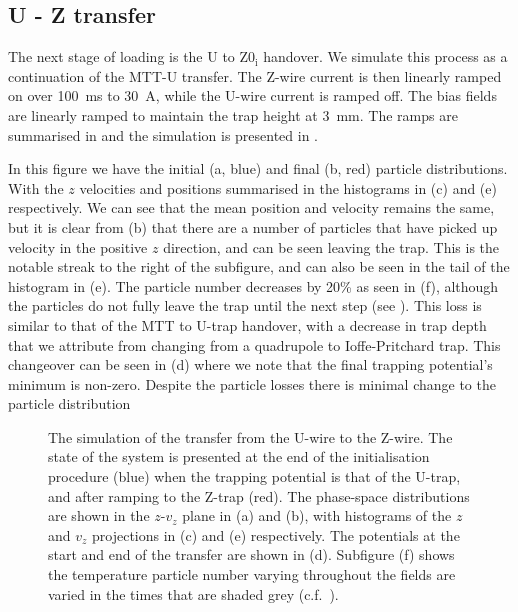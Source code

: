 \subsection{U - Z transfer}
\label{sim:sim:U_to_Z0i}

The next stage of loading is the U to $\mathrm{Z0_i}$ handover. We simulate
this process as a continuation of the MTT-U transfer.  The Z-wire current is
then linearly ramped on over \SI{100}{\milli\second} to \SI{30}{\ampere}, while
the U-wire current is ramped off. The
bias fields are linearly ramped to maintain the trap height at
\SI{3}{\milli\meter}. The ramps are summarised in 
and the simulation is presented in .

In this figure we have the initial (a, blue) and final (b, red) particle
distributions.  With the $z$ velocities and positions summarised in the
histograms in (c) and (e) respectively. We can see that the mean position and
velocity remains the same, but it is clear from (b) that there are a number of
particles that have picked up velocity in the positive $z$ direction, and can
be seen leaving the trap. This is the notable streak to the right of the
subfigure, and can also be seen in the tail of the histogram in (e). The
particle number decreases by 20\% as seen in (f), although the particles do not
fully leave the trap until the next step (see
). This loss is similar to that of the MTT to
U-trap handover, with a decrease in trap depth that we attribute from changing
from a quadrupole to Ioffe-Pritchard trap. This changeover can be seen in (d)
where we note that the final trapping potential's minimum is non-zero. Despite
the particle losses there is minimal change to the particle distribution

\begin{figure}[p]
\centering
  \caption{
    The simulation of the transfer from the U-wire to the Z-wire. The state of
    the system is presented at the end of the initialisation procedure (blue)
    when the trapping potential is that of the U-trap, and after ramping to the
    Z-trap (red). The phase-space distributions are shown in the $z$-$v_z$
    plane in (a) and (b), with histograms of the $z$ and $v_z$ projections in
    (c) and (e) respectively. The potentials at the start and end of the
    transfer are shown in (d). Subfigure (f) shows the temperature particle
    number varying throughout the fields are varied in the times that are
    shaded grey (c.f.~).
  }
  \label{sim:fig:uzsim}
\end{figure}


